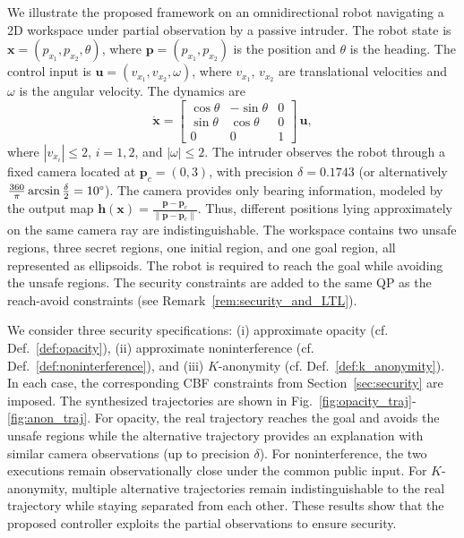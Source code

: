 \documentclass[journal,twoside,web]{ieeecolor}
\begin{document}
We illustrate the proposed framework on an omnidirectional robot navigating a 2D workspace under partial observation by a passive intruder. The robot state is $\mathbf{x} = (p_{x_1}, p_{x_2}, \theta)$, where $\mathbf{p} = (p_{x_1}, p_{x_2})$ is the position and $\theta$ is the heading. The control input is $\mathbf{u} = (v_{x_1}, v_{x_2}, \omega)$, where $v_{x_1}$, $v_{x_2}$ are translational velocities and $\omega$ is the angular velocity. The dynamics are
\begin{equation*}
    \dot{\mathbf{x}} = \begin{bmatrix} \cos \theta & -\sin \theta & 0 \\ \sin \theta & \cos \theta & 0 \\ 0 & 0 & 1 \end{bmatrix} \, \mathbf{u},
\end{equation*}
where $| v_{x_i} | \leq 2$, $i = 1, 2$, and $| \omega | \leq 2$. The intruder observes the robot through a fixed camera located at $\mathbf{p}_c = (0, 3)$, with precision $\delta = 0.1743$ (or alternatively $\tfrac{360}{\pi} \arcsin \tfrac{\delta}{2} = 10\degree$). The camera provides only bearing information, modeled by the output map $\mathbf{h}(\mathbf{x}) = \tfrac{\mathbf{p} - \mathbf{p}_c}{\| \mathbf{p} - \mathbf{p}_c \|}$. Thus, different positions lying approximately on the same camera ray are indistinguishable. The workspace contains two unsafe regions, three secret regions, one initial region, and one goal region, all represented as ellipsoids. The robot is required to reach the goal while avoiding the unsafe regions. The security constraints are added to the same QP as the reach-avoid constraints (see Remark~\ref{rem:security_and_LTL}).

We consider three security specifications: (i) approximate opacity (cf. Def.~\ref{def:opacity}), (ii) approximate noninterference (cf. Def.~\ref{def:noninterference}), and (iii) $K$-anonymity (cf. Def.~\ref{def:k_anonymity}). In each case, the corresponding CBF constraints from Section~\ref{sec:security} are imposed. The synthesized trajectories are shown in Fig.~\ref{fig:opacity_traj}-\ref{fig:anon_traj}. For opacity, the real trajectory reaches the goal and avoids the unsafe regions while the alternative trajectory provides an explanation with similar camera observations (up to precision $\delta$). For noninterference, the two executions remain observationally close under the common public input. For $K$-anonymity, multiple alternative trajectories remain indistinguishable to the real trajectory while staying separated from each other. These results show that the proposed controller exploits the partial observations to ensure security.
\end{document}

